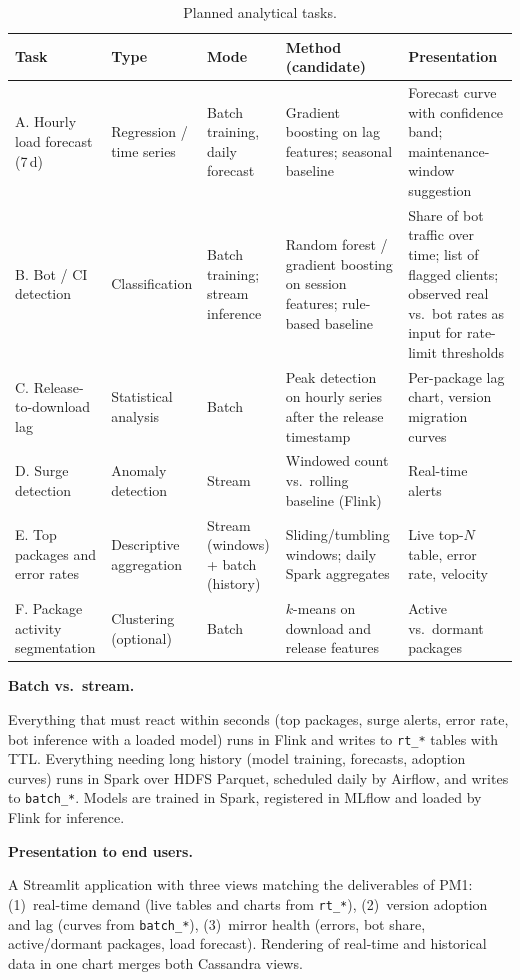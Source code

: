 \documentclass[11pt,a4paper]{article}
\newcommand{\hd}[1]{\par\Needspace{7\baselineskip}\medskip\noindent\textbf{#1}\par\nopagebreak\smallskip}
\begin{document}
\begin{table}[H]
\centering
\caption{Planned analytical tasks.}
\small
\begin{tabularx}{\textwidth}{@{}L{2.5cm}L{2.2cm}L{2.2cm}L{3.0cm}Y@{}}
\toprule
\textbf{Task} & \textbf{Type} & \textbf{Mode} & \textbf{Method (candidate)} & \textbf{Presentation} \\
\midrule
A. Hourly load forecast (7\,d) & Regression / time series & Batch training, daily forecast & Gradient boosting on lag features; seasonal baseline & Forecast curve with confidence band; maintenance-window suggestion \\
B. Bot / CI detection & Classification & Batch training; stream inference & Random forest / gradient boosting on session features; rule-based baseline & Share of bot traffic over time; list of flagged clients; observed real vs.\ bot rates as input for rate-limit thresholds \\
C. Release-to-download lag & Statistical analysis & Batch & Peak detection on hourly series after the release timestamp & Per-package lag chart, version migration curves \\
D. Surge detection & Anomaly detection & Stream & Windowed count vs.\ rolling baseline (Flink) & Real-time alerts \\
E. Top packages and error rates & Descriptive aggregation & Stream (windows) + batch (history) & Sliding/tumbling windows; daily Spark aggregates & Live top-$N$ table, error rate, velocity \\
F. Package activity segmentation & Clustering (optional) & Batch & $k$-means on download and release features & Active vs.\ dormant packages \\
\bottomrule
\end{tabularx}
\end{table}

\hd{Batch vs.\ stream.} Everything that must react within seconds (top packages, surge alerts, error rate, bot inference with a loaded model)
runs in Flink and writes to \texttt{rt\_\allowbreak{}*} tables with TTL. Everything needing long history (model training, forecasts, adoption curves)
runs in Spark over HDFS Parquet, scheduled daily by Airflow, and writes to \texttt{batch\_\allowbreak{}*}. Models are trained in Spark, registered in MLflow
and loaded by Flink for inference.

\hd{Presentation to end users.} A Streamlit application with three views matching the deliverables of PM1:
(1)~real-time demand (live tables and charts from \texttt{rt\_\allowbreak{}*}), (2)~version adoption and lag (curves from \texttt{batch\_\allowbreak{}*}),
(3)~mirror health (errors, bot share, active/dormant packages, load forecast). Rendering of real-time and historical data in one chart
merges both Cassandra views.
\end{document}
